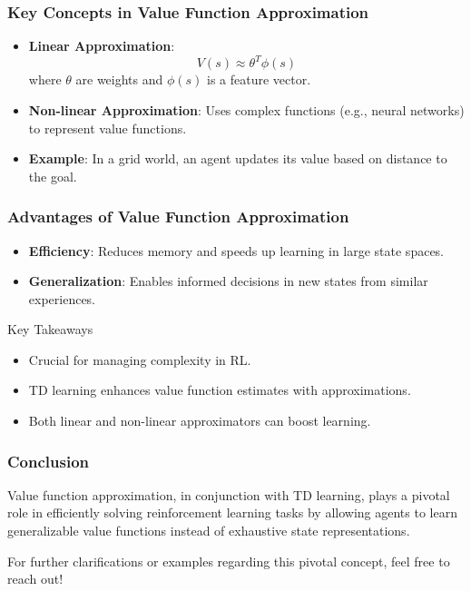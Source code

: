 \documentclass[aspectratio=169]{beamer}
\begin{document}
\begin{frame}[fragile]
    \frametitle{Key Concepts in Value Function Approximation}
    \begin{itemize}
        \item \textbf{Linear Approximation}: 
        \[
        V(s) \approx \theta^T \phi(s)
        \]
        where \(\theta\) are weights and \(\phi(s)\) is a feature vector.
        
        \item \textbf{Non-linear Approximation}: 
        Uses complex functions (e.g., neural networks) to represent value functions.
        
        \item \textbf{Example}: In a grid world, an agent updates its value based on distance to the goal.
    \end{itemize}
\end{frame}

\begin{frame}[fragile]
    \frametitle{Advantages of Value Function Approximation}
    \begin{itemize}
        \item \textbf{Efficiency}: Reduces memory and speeds up learning in large state spaces.
        \item \textbf{Generalization}: Enables informed decisions in new states from similar experiences.
    \end{itemize}
    \begin{block}{Key Takeaways}
        \begin{itemize}
            \item Crucial for managing complexity in RL.
            \item TD learning enhances value function estimates with approximations.
            \item Both linear and non-linear approximators can boost learning.
        \end{itemize}
    \end{block}
\end{frame}

\begin{frame}[fragile]
    \frametitle{Conclusion}
    Value function approximation, in conjunction with TD learning, plays a pivotal role in efficiently solving reinforcement learning tasks by allowing agents to learn generalizable value functions instead of exhaustive state representations.
    
    For further clarifications or examples regarding this pivotal concept, feel free to reach out!
\end{frame}
\end{document}

